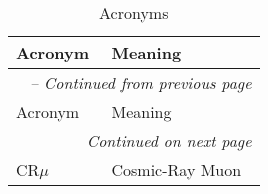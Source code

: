 \begin{longtable}{p{} p{}}
    \caption{Acronyms} \label{tab:acronyms}                                              \\

    \toprule
    Acronym & Meaning                                                                    \\
    \midrule
    \endfirsthead

    \multicolumn{2}{l}{\textit{\tablename\ \thetable{} -- Continued from previous page}} \\
    \toprule
    Acronym & Meaning                                                                    \\
    \midrule
    \endhead

    \multicolumn{2}{r}{\textit{Continued on next page}}                                  \\
    \bottomrule
    \endfoot

    \bottomrule
    \endlastfoot


    CR$\mu$ & Cosmic-Ray Muon                                                            \\
\end{longtable}
